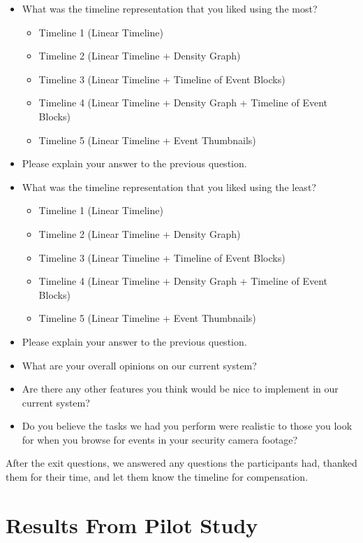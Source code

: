 \documentclass[doublespace,draft,nopageskip]{VTthesis} %
\begin{document}
\begin{itemize}
    \item What was the timeline representation that you liked using the most?
    \begin{itemize}
        \item Timeline 1 (Linear Timeline)
        \item Timeline 2 (Linear Timeline + Density Graph)
        \item Timeline 3 (Linear Timeline + Timeline of Event Blocks)
        \item Timeline 4 (Linear Timeline + Density Graph + Timeline of Event Blocks)
        \item Timeline 5 (Linear Timeline + Event Thumbnails)
    \end{itemize}
    \item Please explain your answer to the previous question.
    \item What was the timeline representation that you liked using the least?
    \begin{itemize}
        \item Timeline 1 (Linear Timeline)
        \item Timeline 2 (Linear Timeline + Density Graph)
        \item Timeline 3 (Linear Timeline + Timeline of Event Blocks)
        \item Timeline 4 (Linear Timeline + Density Graph + Timeline of Event Blocks)
        \item Timeline 5 (Linear Timeline + Event Thumbnails)
    \end{itemize}
    \item Please explain your answer to the previous question.
    \item What are your overall opinions on our current system?
    \item Are there any other features you think would be nice to implement in our current system?
    \item Do you believe the tasks we had you perform were realistic to those you look for when you browse for events in your security camera footage?
\end{itemize}

After the exit questions, we answered any questions the participants had, thanked them for their time, and let them know the timeline for compensation.

\chapter{Results From Pilot Study} \label{ch:results}
\end{document}
